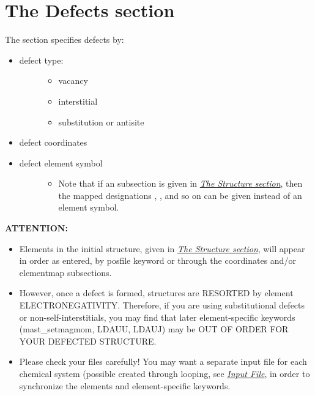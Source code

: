 \documentclass[letterpaper,10pt,english]{sphinxmanual}
\begin{document}
\section{The Defects section}
\label{3_1_5_defects::doc}\label{3_1_5_defects:the-defects-section}
The  section specifies defects by:
\begin{itemize}
\item {} \begin{description}
\item[{defect type:}] \leavevmode\begin{itemize}
\item {} 
vacancy

\item {} 
interstitial

\item {} 
substitution or antisite

\end{itemize}

\end{description}

\item {} 
defect coordinates

\item {} \begin{description}
\item[{defect element symbol}] \leavevmode\begin{itemize}
\item {} 
Note that if an  subsection is given in {\hyperref[3_1_1_structure::doc]{\emph{The Structure section}}}, then the mapped designations , , and so on can be given instead of an element symbol.

\end{itemize}

\end{description}

\end{itemize}

\textbf{ATTENTION:}
\begin{itemize}
\item {} 
Elements in the initial structure, given in {\hyperref[3_1_1_structure::doc]{\emph{The Structure section}}}, will appear in order as entered, by posfile keyword or through the coordinates and/or elementmap subsections.

\item {} 
However, once a defect is formed, structures are RESORTED by element ELECTRONEGATIVITY.  Therefore, if you are using substitutional defects or non-self-interstitials, you may find that later element-specific keywords (mast\_setmagmom, LDAUU, LDAUJ) may be OUT OF ORDER FOR YOUR DEFECTED STRUCTURE.

\item {} 
Please check your files carefully! You may want a separate input file for each chemical system (possible created through looping, see {\hyperref[3_0_inputfile::doc]{\emph{Input File}}}, in order to synchronize the elements and element-specific keywords.

\end{itemize}
\end{document}
